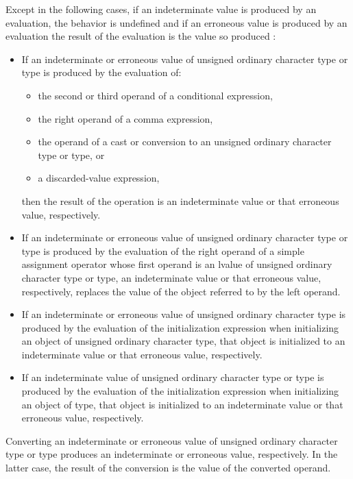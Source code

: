 \begin{adjustwidth}{0.5cm}{0.5cm}
Except in the following cases,
if an indeterminate value is produced by an evaluation,
the behavior is undefined
 and if an erroneous value is produced by an evaluation
the result of the evaluation is the value so produced 
:

\begin{itemize}
\item
  If an indeterminate or erroneous value of
  unsigned ordinary character type
  or  type
  is produced by the evaluation of:
  \begin{itemize}
  \item
    the second or third operand of a conditional expression,
  \item
    the right operand of a comma expression,
  \item
    the operand of a cast or conversion
    to an unsigned ordinary character type
    or  type, or
  \item
    a discarded-value expression,
  \end{itemize}
  then the result of the operation is an indeterminate value or
  that erroneous value, respectively.
\item
  If an indeterminate or erroneous value of
  unsigned ordinary character type or  type
  is produced by the evaluation of
  the right operand of a simple assignment operator
  whose first operand is an lvalue of
  unsigned ordinary character type or  type,
  an indeterminate value or that erroneous value, respectively, replaces
  the value of the object referred to by the left operand.
\item
  If an indeterminate or erroneous value of unsigned ordinary character type
  is produced by the evaluation of the initialization expression
  when initializing an object of unsigned ordinary character type,
  that object is initialized to an indeterminate
  value or that erroneous value, respectively.
\item
  If an indeterminate value of
  unsigned ordinary character type or  type
  is produced by the evaluation of the initialization expression
  when initializing an object of  type,
  that object is initialized to an indeterminate value or
  that erroneous value, respectively.
\end{itemize}
Converting an indeterminate or erroneous value of
unsigned ordinary character type or  type
produces an indeterminate or erroneous value, respectively.
In the latter case,
the result of the conversion is the value of the converted operand.


\end{adjustwidth}
